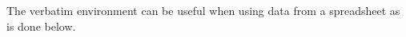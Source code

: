 %
%

\newpage
The verbatim environment can be useful when using data from a spreadsheet as is done below. \\

